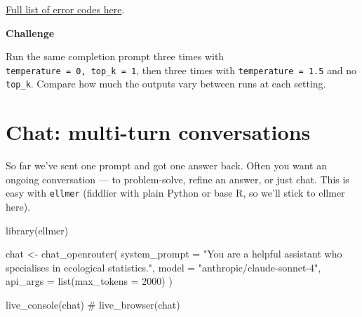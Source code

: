 \documentclass[
  letterpaper,
  DIV=11,
  numbers=noendperiod]{scrreprt}
\newenvironment{Shaded}{\begin{snugshade}}{\end{snugshade}}
\newcommand{\AttributeTok}[1]{\textcolor[rgb]{0.40,0.45,0.13}{#1}}
\newcommand{\CommentTok}[1]{\textcolor[rgb]{0.37,0.37,0.37}{#1}}
\newcommand{\DecValTok}[1]{\textcolor[rgb]{0.68,0.00,0.00}{#1}}
\newcommand{\FunctionTok}[1]{\textcolor[rgb]{0.28,0.35,0.67}{#1}}
\newcommand{\NormalTok}[1]{\textcolor[rgb]{0.00,0.23,0.31}{#1}}
\newcommand{\OtherTok}[1]{\textcolor[rgb]{0.00,0.23,0.31}{#1}}
\newcommand{\StringTok}[1]{\textcolor[rgb]{0.13,0.47,0.30}{#1}}
\begin{document}
\href{https://openrouter.ai/docs/api-reference/errors}{Full list of
error codes here}.

\begin{tcolorbox}[enhanced jigsaw, toprule=.15mm, rightrule=.15mm, left=2mm, leftrule=.75mm, breakable, opacityback=0, arc=.35mm, colframe=quarto-callout-important-color-frame, bottomrule=.15mm, colback=white]
\begin{minipage}[t]{5.5mm}
\textcolor{quarto-callout-important-color}{\faExclamation}
\end{minipage}%
\begin{minipage}[t]{\textwidth - 5.5mm}

\vspace{-3mm}\textbf{Challenge}\vspace{3mm}

Run the same completion prompt three times with
\texttt{temperature\ =\ 0,\ top\_k\ =\ 1}, then three times with
\texttt{temperature\ =\ 1.5} and no \texttt{top\_k}. Compare how much
the outputs vary between runs at each setting.

\end{minipage}%
\end{tcolorbox}

\chapter{Chat: multi-turn
conversations}\label{chat-multi-turn-conversations}

So far we've sent one prompt and got one answer back. Often you want an
ongoing conversation --- to problem-solve, refine an answer, or just
chat. This is easy with \texttt{ellmer} (fiddlier with plain Python or
base R, so we'll stick to ellmer here).

\begin{Shaded}
\begin{Highlighting}[]
\FunctionTok{library}\NormalTok{(ellmer)}

\NormalTok{chat }\OtherTok{\textless{}{-}} \FunctionTok{chat\_openrouter}\NormalTok{(}
  \AttributeTok{system\_prompt =} \StringTok{"You are a helpful assistant who specialises in ecological statistics."}\NormalTok{,}
  \AttributeTok{model =} \StringTok{"anthropic/claude{-}sonnet{-}4"}\NormalTok{,}
  \AttributeTok{api\_args =} \FunctionTok{list}\NormalTok{(}\AttributeTok{max\_tokens =} \DecValTok{2000}\NormalTok{)}
\NormalTok{)}

\FunctionTok{live\_console}\NormalTok{(chat)}
\CommentTok{\# live\_browser(chat)}
\end{Highlighting}
\end{Shaded}
\end{document}
